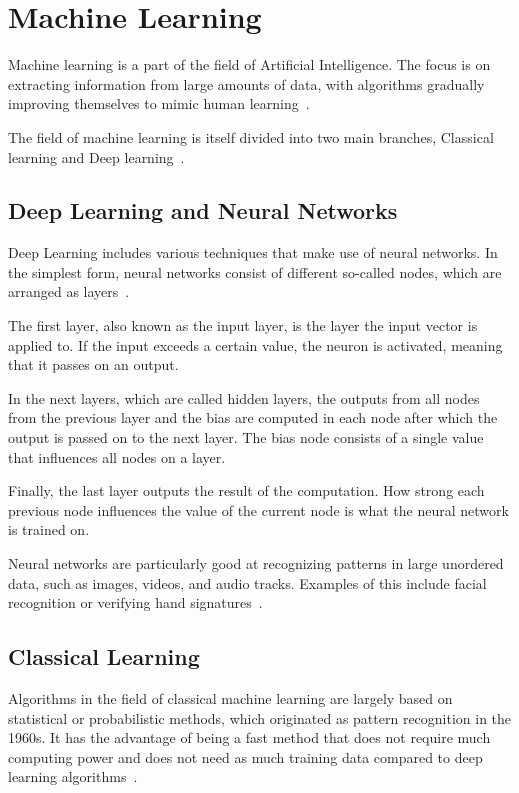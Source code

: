 \section{Machine Learning}\label{sec:machine_learning}
Machine learning is a part of the field of Artificial Intelligence. The focus is on extracting information from large amounts of data, with algorithms gradually improving themselves to mimic human learning~\cite{what-is-ml}.

The field of machine learning is itself divided into two main branches, Classical learning and Deep learning~\cite{ml-visual-explanation}.


\subsection{Deep Learning and Neural Networks}

Deep Learning includes various techniques that make use of neural networks. In the simplest form, neural networks consist of different so-called nodes, which are arranged as layers~\cite{neuralNet}.

The first layer, also known as the input layer, is the layer the input vector is applied to. If the input exceeds a certain value, the neuron is activated, meaning that it passes on an output.

In the next layers, which are called hidden layers, the outputs from all nodes from the previous layer and the bias are computed in each node after which the output is passed on to the next layer. The bias node consists of a single value that influences all nodes on a layer.

Finally, the last layer outputs the result of the computation. How strong each previous node influences the value of the current node is what the neural network is trained on.

Neural networks are particularly good at recognizing patterns in large unordered data, such as images, videos, and audio tracks. Examples of this include facial recognition or verifying hand signatures~\cite{neuralNet-applications}.



\subsection{Classical Learning}
Algorithms in the field of classical machine learning are largely based on statistical or probabilistic methods, which originated as pattern recognition in the 1960s. It has the advantage of being a fast method that does not require much computing power and does not need as much training data compared to deep learning algorithms~\cite{classical-ml}.


